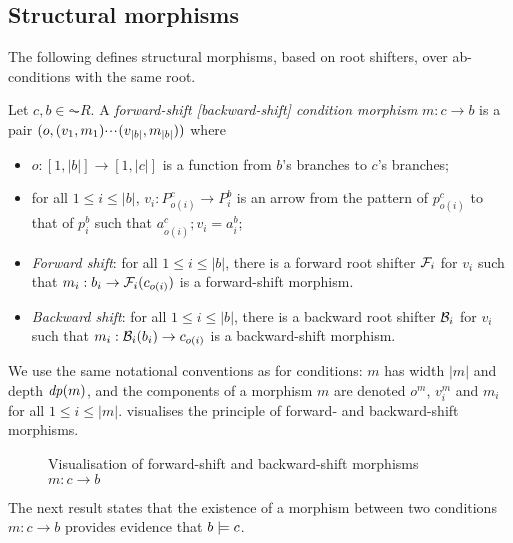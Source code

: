 \subsection{Structural morphisms}

The following defines structural morphisms, based on root shifters, over ab-conditions with the same root.

\begin{definition}
  Let $c,b \in \AC{R}$. A \emph{forward-shift [backward-shift] condition morphism} $m: c \to b$ is a pair $(o,(v_1,m_1){\cdotp\mkern-2mu\cdotp\mkern-2mu\cdotp\mkern1mu} (v_{|b|},m_{|b|}))$ where
  \begin{itemize}[topsep=\smallskipamount]
  \item $o:[1,|b|]\to[1,|c|]$ is a function from $b$'s branches to $c$'s branches;
  \item for all $1\leq i\leq |b|$, $v_i:P^c_{o(i)}\to P^b_i$ is an arrow from the pattern of $p^c_{o(i)}$ to that of $p^b_i$ such that $a^c_{o(i)};v_i=a^b_i$;
  \item\emph{Forward shift}: for all $1\leq i\leq |b|$, there is a forward root shifter $\mathcal{F}_i$ for $v_i$ such that $m_i:b_i \rightarrow \mathcal{F}_i(c_{o(i)})$ is a forward-shift morphism.
  \item\emph{Backward shift}: for all $1\leq i\leq |b|$, there is a backward root shifter $\mathcal{B}_i$ for $v_i$ such that $m_i:\mathcal{B}_i(b_i) \rightarrow c_{o(i)}$ is a backward-shift morphism.
  \end{itemize}
\end{definition}
%
We use the same notational conventions as for conditions: $m$ has width $|m|$ and depth $\mathit{dp}(m)$, and the components of a morphism $m$ are denoted $o^m$, $v^m_i$ and $m_i$ for all $1\leq i\leq |m|$.  visualises the principle of forward- and backward-shift morphisms.
%
\begin{figure}[t]
\centering

\caption{Visualisation of forward-shift and backward-shift morphisms $m:c \to b$}
\end{figure}
%
The next result states that the existence of a morphism between two conditions $m: c \to b$ provides evidence that $b\models c$.

